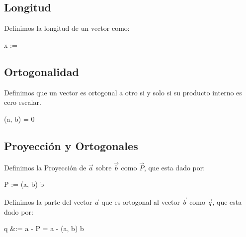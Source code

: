 \documentclass[12pt, fleqn]{report}                             %
\def \Eq {equation}                                             %
\newenvironment{MultiLineEquation*}[1]                          %
        {\begin{\Eq*}\begin{alignedat}{#1}}                         %
        {\end{alignedat}\end{\Eq*}}                                 %
\theoremstyle{break}                                            %
\newcommand{\Abs}[1]    {\left\lVert #1 \right\lVert}           %
\begin{document}
            \subsection{Longitud}

                Definimos la longitud de un vector como:
                \begin{MultiLineEquation*}{3}
                    \Abs{\vec x} := 
                \end{MultiLineEquation*}

            \subsection{Ortogonalidad}

                Definimos que un vector es ortogonal a otro si y solo si su producto interno es cero escalar.
                \begin{MultiLineEquation*}{3}
                    (\vec a, \vec b) = 0
                \end{MultiLineEquation*}

            \subsection{Proyección y Ortogonales}

                Definimos la Proyección de $\vec a$ sobre $\vec b$ como $\vec P$, que esta dado por:
                \begin{MultiLineEquation*}{3}
                    \vec P :=
                     \; (\vec a, \vec b) \; \vec b
                \end{MultiLineEquation*}

                Definimos la parte del vector $\vec a$ que es ortogonal al vector $\vec b$ como $\vec q$, que esta dado por:
                \begin{MultiLineEquation*}{3}
                    \vec q 
                    &:= \vec a - \vec P                                                        
                    = \vec a -  \; (\vec a, \vec b) \; \vec b
                \end{MultiLineEquation*}
\end{document}
